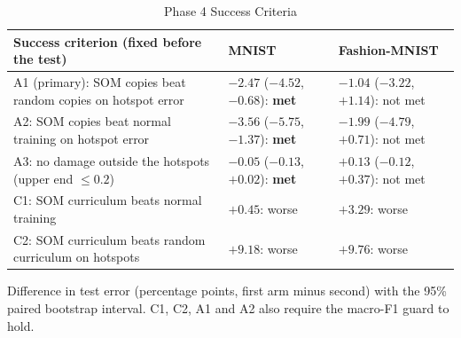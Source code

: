 \documentclass{scrartcl}
\begin{document}
\begin{table}[H]
\centering
\caption{Phase 4 Success Criteria}
\label{tab:criteria}
\renewcommand{\arraystretch}{1.12}
\footnotesize
\begin{tabular}{|L{0.40\textwidth}|C{0.24\textwidth}|C{0.24\textwidth}|}
\hline
\textbf{Success criterion (fixed before the test)} & \textbf{MNIST} & \textbf{Fashion-MNIST} \\ \hline
A1 (primary): SOM copies beat random copies on hotspot error & $-2.47$ ($-4.52$, $-0.68$): \textbf{met} & $-1.04$ ($-3.22$, $+1.14$): not met \\ \hline
A2: SOM copies beat normal training on hotspot error & $-3.56$ ($-5.75$, $-1.37$): \textbf{met} & $-1.99$ ($-4.79$, $+0.71$): not met \\ \hline
A3: no damage outside the hotspots (upper end $\le 0.2$) & $-0.05$ ($-0.13$, $+0.02$): \textbf{met} & $+0.13$ ($-0.12$, $+0.37$): not met \\ \hline
C1: SOM curriculum beats normal training & $+0.45$: worse & $+3.29$: worse \\ \hline
C2: SOM curriculum beats random curriculum on hotspots & $+9.18$: worse & $+9.76$: worse \\ \hline
\end{tabular}

\par\vspace{3pt}
{\footnotesize\raggedright\noindent Difference in test error (percentage points, first arm minus second) with the 95\% paired bootstrap interval. C1, C2, A1 and A2 also require the macro-F1 guard to hold.\par}
\end{table}
\end{document}
